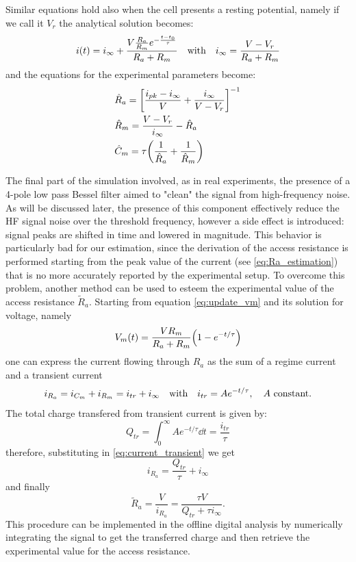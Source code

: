 \documentclass[a4paper]{article}
\begin{document}
Similar equations hold also when the cell presents a resting potential, namely if we call it $V_r$ the analytical solution becomes: 
\begin{equation}
    i(t) = i_\infty + \frac{V \frac{R_a}{R_m} e^{-\frac{t-t_0}{\tau}}}{R_a+R_m}\qq{with} i_\infty= \frac{V-V_r}{R_a+R_m}
\end{equation}
and the equations for the experimental parameters become:
\begin{align}
&\hat{R}_a = \bqty{\frac{i_{pk}-i_\infty}{V} + \frac{i_\infty}{V-V_r}}^{-1}\\
&\hat{R}_m = \frac{V-V_r}{i_\infty} - \hat{R}_a\\
&\hat{C}_m = \tau\pqty{\frac{1}{\hat{R}_a}+\frac{1}{\hat{R}_m}}
\end{align}


The final part of the simulation involved, as in real experiments, the presence of a 4-pole low pass Bessel filter aimed to "clean" the signal from high-frequency noise.
As will be discussed later, the presence of this component effectively reduce the HF signal noise over the threshold frequency, however a side effect is introduced: signal peaks are shifted in time and lowered in magnitude.
This behavior is particularly bad for our estimation, since the derivation of the access resistance is performed starting from the peak value of the current (see \eqref{eq:Ra_estimation}) that is no more accurately reported by the experimental setup.
To overcome this problem, another method can be used to esteem the experimental value of the access resistance $\tilde{R}_a.$
Starting from equation \eqref{eq:update_vm} and its solution for voltage, namely
\begin{equation}
    V_m(t) = \frac{V R_m}{R_a+R_m} \pqty{1-e^{-t/\tau}}
\end{equation}
one can express the current flowing through $R_a$ as the sum of a regime current and a transient current
\begin{equation}
    i_{R_a} = i_{C_m} + i_{R_m} = i_{tr}+ i_\infty \qq{with} i_{tr} = Ae^{-t/\tau}, \quad A \text{ constant.}
    \label{eq:current_transient}
\end{equation}
The total charge transfered from transient current is given by:
\begin{equation}
    Q_{tr} = \int_0^\infty Ae^{-t/\tau}\dd{t} = \frac{i_{tr}}{\tau}
\end{equation}
therefore, substituting in \eqref{eq:current_transient} we get
\begin{equation}
    i_{R_a} = \frac{Q_{tr}}{\tau} + i_\infty
\end{equation}
and finally
\begin{equation}
    \tilde{R}_a = \frac{V}{i_{R_a}} = \frac{\tau V}{Q_{tr} + \tau i_\infty}.
\end{equation}
This procedure can be implemented in the offline digital analysis by numerically integrating the signal to get the transferred charge and then retrieve the experimental value for the access resistance.
\end{document}
